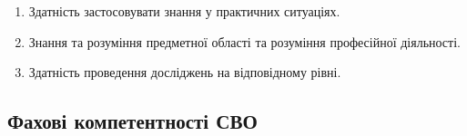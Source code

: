 \documentclass{Syllabus}
\begin{document}
\begin{enumerate}
\item [ЗК 1:] Здатність застосовувати знання у практичних ситуаціях.
\item [ЗК 2:] Знання та розуміння предметної області та розуміння професійної діяльності.
\item [ЗК 6:] Здатність проведення досліджень на відповідному рівні.
\end{enumerate}

\subsection*{Фахові компетентності СВО}
\end{document}
